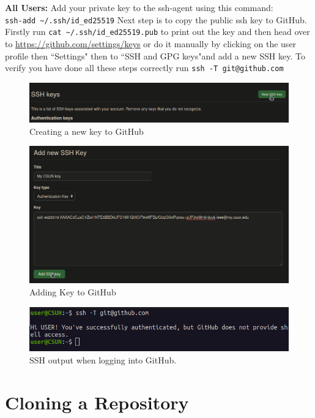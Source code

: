 \documentclass[12pt, a4paper]{article}
\begin{document}
\noindent \textbf{All Users:} Add your private key to the ssh-agent using this command:\\
\verb`ssh-add ~/.ssh/id_ed25519` Next step is to copy the public ssh key to GitHub. Firstly run \verb`cat ~/.ssh/id_ed25519.pub` to print out the key and then head over to \url{https://github.com/settings/keys} or do it manually by clicking on the user profile then ``Settings" then to ``SSH and GPG keys"and add a new SSH key. To verify you have done all these steps correctly run \texttt{ssh -T git@github.com} 
\begin{figure}[H]
\centering
\includegraphics[scale=0.4]{../images/workshop-I/GH-new-key.png}
\caption{Creating a new key to GitHub}
\end{figure}
\begin{figure}[H]
\centering
\includegraphics[scale=0.5]{../images/workshop-I/GH-add-key.png}
\caption{Adding Key to GitHub}
\end{figure}
\begin{figure}[H]
\centering
\includegraphics[scale=0.5]{../images/workshop-I/ssh-T.png}
\caption{SSH output when logging into GitHub.}
\end{figure}

\section{Cloning a Repository}
\end{document}
